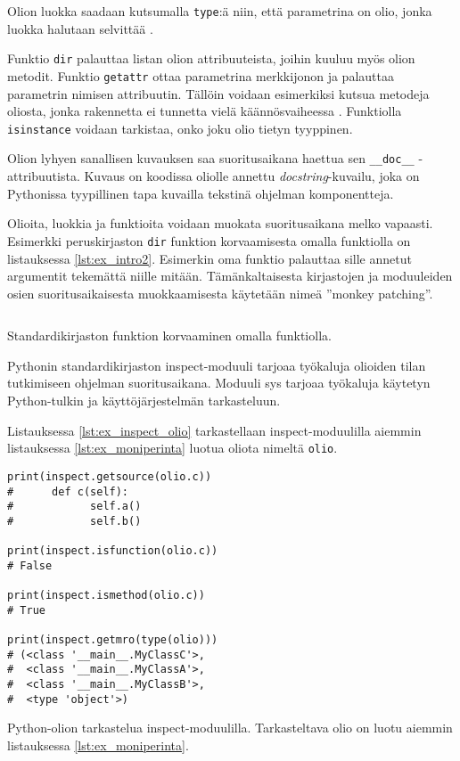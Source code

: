 \documentclass[finnish]{tktltiki2}
\theoremstyle{definition}
\theoremstyle{remark}
\begin{document}
Olion luokka saadaan kutsumalla \verb|type|:ä niin, että parametrina on olio, jonka luokka halutaan selvittää \cite{dive-into-python}. 

Funktio \verb|dir| palauttaa listan olion attribuuteista, joihin kuuluu myös olion metodit. Funktio \verb|getattr| ottaa parametrina merkkijonon ja palauttaa parametrin nimisen attribuutin. Tällöin voidaan esimerkiksi kutsua metodeja oliosta, jonka rakennetta ei tunnetta vielä käännösvaiheessa \cite{dive-into-python}. Funktiolla \verb|isinstance| voidaan tarkistaa, onko joku olio tietyn tyyppinen. 

Olion lyhyen sanallisen kuvauksen saa suoritusaikana haettua sen \verb|__doc__| -attribuutista. Kuvaus on koodissa oliolle annettu \emph{docstring}-kuvailu, joka on Pythonissa tyypillinen tapa kuvailla tekstinä ohjelman komponentteja.

Olioita, luokkia ja funktioita voidaan muokata suoritusaikana melko vapaasti. Esimerkki peruskirjaston \verb|dir| funktion korvaamisesta omalla funktiolla on listauksessa \ref{lst:ex_intro2}. Esimerkin oma funktio palauttaa sille annetut argumentit tekemättä niille mitään. Tämänkaltaisesta kirjastojen ja moduuleiden osien suoritusaikaisesta muokkaamisesta käytetään nimeä ''monkey patching''.

\begin{listing}
    \inputminted[linenos,frame=single,framesep=10pt]{python}{code/introspektio2.py}
    \caption{Standardikirjaston funktion korvaaminen omalla funktiolla.}
    \label{lst:ex_intro2}
\end{listing}

Pythonin standardikirjaston inspect-moduuli tarjoaa työkaluja olioiden tilan tutkimiseen ohjelman suoritusaikana. Moduuli sys tarjoaa työkaluja käytetyn Python-tulkin ja käyttöjärjestelmän tarkasteluun.

Listauksessa \ref{lst:ex_inspect_olio} tarkastellaan inspect-moduulilla aiemmin listauksessa \ref{lst:ex_moniperinta} luotua oliota nimeltä \verb|olio|.

\begin{listing}
\begin{verbatim}
print(inspect.getsource(olio.c))
#      def c(self):
#            self.a()
#            self.b()

print(inspect.isfunction(olio.c))
# False

print(inspect.ismethod(olio.c))
# True

print(inspect.getmro(type(olio)))
# (<class '__main__.MyClassC'>,
#  <class '__main__.MyClassA'>,
#  <class '__main__.MyClassB'>,
#  <type 'object'>)

\end{verbatim}
    \caption{Python-olion tarkastelua inspect-moduulilla. Tarkasteltava olio on luotu aiemmin listauksessa \ref{lst:ex_moniperinta}.}
    \label{lst:ex_inspect_olio}
\end{listing}
\end{document}
